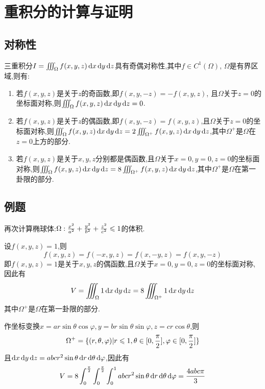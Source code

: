 \setcounter{chapter}{21} %

\chapter{重积分的计算与证明}

\section{对称性}

三重积分$I = \iiint_\Omega f(x,y,z) \operatorname{d\!} x \operatorname{d\!} y \operatorname{d\!} z$具有奇偶对称性,其中$f \in C^1(\Omega)$, $\Omega$是有界区域,则有:

\begin{enumerate}
    \item 若$f(x,y,z)$是关于$z$的奇函数,即$f(x,y,-z) = -f(x,y,z)$,
    且$\Omega$关于$z=0$的坐标面对称,则$\iiint_\Omega f(x,y,z) \operatorname{d\!} x \operatorname{d\!} y \operatorname{d\!} z = 0$.
    \item 若$f(x,y,z)$是关于$z$的偶函数,即$f(x,y,-z) = f(x,y,z)$,且$\Omega$关于$z=0$的坐标面对称,则$\iiint_\Omega f(x,y,z) \operatorname{d\!} x \operatorname{d\!} y \operatorname{d\!} z = 2 \iiint_{\Omega^+} f(x,y,z) \operatorname{d\!} x \operatorname{d\!} y \operatorname{d\!} z$,其中$\Omega^+$是$\Omega$在$z=0$上方的部分.
    \item 若$f(x,y,z)$是关于$x,y,z$分别都是偶函数,且$\Omega$关于$x=0,y=0,z=0$的坐标面对称,则$\iiint_\Omega f(x,y,z) \operatorname{d\!} x \operatorname{d\!} y \operatorname{d\!} z = 8 \iiint_{\Omega^+} f(x,y,z) \operatorname{d\!} x \operatorname{d\!} y \operatorname{d\!} z$,其中$\Omega^+$是$\Omega$在第一卦限的部分.
\end{enumerate}

\section{例题}

\begin{example}
    再次计算椭球体:$\Omega: \frac{x^2}{a^2} + \frac{y^2}{b^2} + \frac{z^2}{c^2} \leqslant 1$的体积.
\end{example}

\begin{solution}
设$f(x,y,z) = 1$,则
$$f(x,y,z) = f(-x,y,z) = f(x,-y,z) = f(x,y,-z)$$
即$f(x,y,z)=1$是关于$x,y,z$的偶函数,且$\Omega$关于$x=0,y=0,z=0$的坐标面对称,因此有
$$V = \iiint_\Omega 1 \operatorname{d\!} x \operatorname{d\!} y \operatorname{d\!} z = 8 \iiint_{\Omega^+} 1 \operatorname{d\!} x \operatorname{d\!} y \operatorname{d\!} z$$
其中$\Omega^+$是$\Omega$在第一卦限的部分.

作坐标变换$x = a r \sin \theta \cos \varphi, y = b r \sin \theta \sin \varphi, z = c r \cos \theta$,则
$$\Omega^+ = \{ (r,\theta,\varphi) | r \leqslant 1, \theta \in [0,\frac{\pi}{2}], \varphi \in [0,\frac{\pi}{2}] \}$$
且$\operatorname{d\!} x \operatorname{d\!} y \operatorname{d\!} z = abc r^2 \sin \theta \operatorname{d\!} r \operatorname{d\!} \theta \operatorname{d\!} \varphi$,因此有
$$V = 8 \int_0^{\frac{\pi}{2}} \int_0^{\frac{\pi}{2}} \int_0^1 abc r^2 \sin \theta \operatorname{d\!} r \operatorname{d\!} \theta \operatorname{d\!} \varphi = \frac{4abc \pi}{3}$$
\end{solution}

